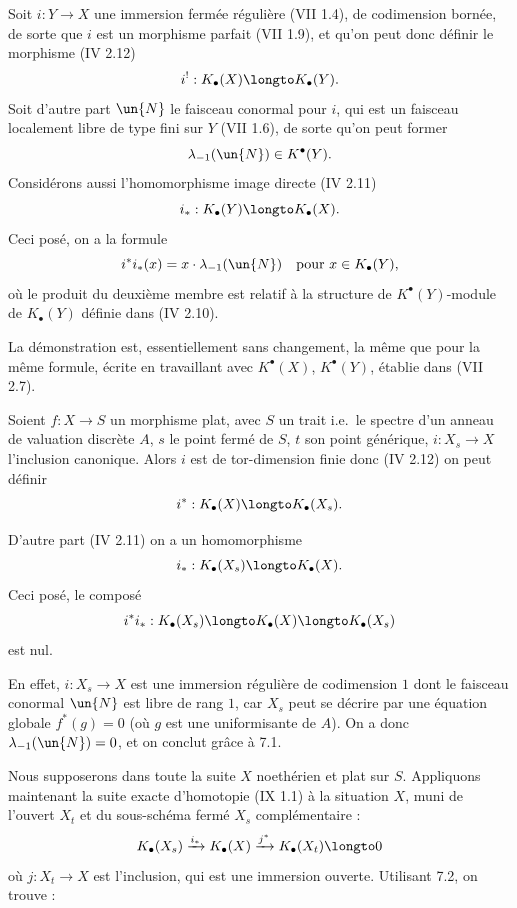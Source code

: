 \begin{lemme}[7.1]
Soit $i : Y \to X$ une immersion ferm\'ee r\'eguli\`ere (VII 1.4), de codimension born\'ee, de sorte que $i$ est un morphisme parfait (VII 1.9), et qu'on peut donc d\'efinir le morphisme (IV 2.12)
\[
i^{!} : K_{\bullet}(X) \longto K_{\bullet}(Y).
\]
Soit d'autre part $\un{N}$ le faisceau conormal pour $i$, qui est un faisceau localement libre de type fini sur $Y$ (VII 1.6), de sorte qu'on peut former
\[
\lambda_{-1}(\un{N}) \in K^{\bullet}(Y).
\]
Consid\'erons aussi l'homomorphisme image directe (IV 2.11)
\[
i_{*} : K_{\bullet}(Y) \longto K_{\bullet}(X).
\]
Ceci pos\'e, on a la formule
\[
i^{*}i_{*}(x) = x \cdot \lambda_{-1}(\un{N}) \quad \text{pour } x \in K_{\bullet}(Y),
\]
o\`u le produit du deuxi\`eme membre est relatif \`a la structure de $K^{\bullet}(Y)$-module de $K_{\bullet}(Y)$ d\'efinie dans (IV 2.10).
\end{lemme}

La d\'emonstration est, essentiellement sans changement, la m\^eme que pour la m\^eme formule, \'ecrite en travaillant avec $K^{\bullet}(X)$, $K^{\bullet}(Y)$, \'etablie dans (VII 2.7).

\begin{corollaire}[7.2]
Soient $f : X \to S$ un morphisme plat, avec $S$ un trait i.e.\ le spectre d'un anneau de valuation discr\`ete $A$, $s$ le point ferm\'e de $S$, $t$ son point g\'en\'erique, $i : X_{s} \to X$ l'inclusion canonique. Alors $i$ est de tor-dimension finie donc (IV 2.12) on peut d\'efinir
\[
i^{*} : K_{\bullet}(X) \longto K_{\bullet}(X_{s}).
\]
\end{corollaire}

D'autre part (IV 2.11) on a un homomorphisme
\[
i_{*} : K_{\bullet}(X_{s}) \longto K_{\bullet}(X).
\]
Ceci pos\'e, le compos\'e
\[
i^{*}i_{*} : K_{\bullet}(X_{s}) \longto K_{\bullet}(X) \longto K_{\bullet}(X_{s})
\]
est nul.

En effet, $i : X_{s} \to X$ est une immersion r\'eguli\`ere de codimension $1$ dont le faisceau conormal $\un{N}$ est libre de rang $1$, car $X_{s}$ peut se d\'ecrire par une \'equation globale $f^{*}(g) = 0$ (o\`u $g$ est une uniformisante de $A$). On a donc $\lambda_{-1}(\un{N}) = 0$, et on conclut gr\^ace \`a 7.1.

Nous supposerons dans toute la suite $X$ noeth\'erien et plat sur $S$. Appliquons maintenant la suite exacte d'homotopie (IX 1.1) \`a la situation $X$, muni de l'ouvert $X_{t}$ et du sous-sch\'ema ferm\'e $X_{s}$ compl\'ementaire :
\[
K_{\bullet}(X_{s}) \xrightarrow{i_{*}} K_{\bullet}(X) \xrightarrow{j^{*}} K_{\bullet}(X_{t}) \longto 0
\]
o\`u $j : X_{t} \to X$ est l'inclusion, qui est une immersion ouverte. Utilisant 7.2, on trouve :

